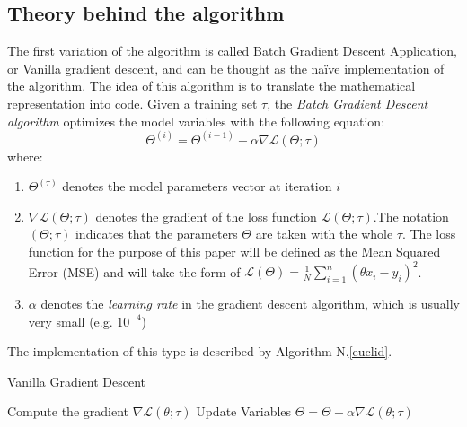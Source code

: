 \documentclass[conference]{IEEEtran}
\begin{document}
\subsection{Theory behind the algorithm}
The first variation of the algorithm is called Batch Gradient Descent Application, or Vanilla gradient descent, and can be thought as the naïve implementation of the algorithm.\cite{JZ2019} 
The idea of this algorithm is to translate the mathematical representation into code. 
Given a training set $\tau$, the \textit{Batch Gradient Descent algorithm} optimizes the model variables with the following equation:
\begin{equation}
    \Theta^{(i)} = \Theta^{(i-1)} -\alpha\nabla\mathscr{L}(\Theta;\tau)\label{BGDA}
\end{equation}
where:
\begin{enumerate}
  \item $\Theta^{(\tau)}$ denotes the model parameters vector at iteration $i$
  \item $\nabla\mathscr{L}(\Theta;\tau)$ denotes the gradient of the loss function $\mathscr{L}(\Theta;\tau)$.The notation $(\Theta;\tau)$ indicates that the parameters $\Theta$ are taken with the whole $\tau$. The loss function for the purpose of this paper will be defined as the Mean Squared Error (MSE) and will take the form of $\mathscr{L}(\Theta)= \frac{1}{N}\sum_{i=1}^{n}(\theta x_i - y_i)^2$.
  \item $\alpha$ denotes the  \textit{learning rate} in the gradient descent algorithm, which is usually very small (e.g. $10^{-4}$)
\end{enumerate}

The implementation of this type is described by Algorithm N.\ref{euclid}.

\begin{algorithm}
\caption{Vanilla Gradient Descent}\label{euclid}
\begin{algorithmic}[1]
\State Compute the gradient $\nabla\mathscr{L}(\theta;\tau)$
\State Update Variables $\Theta = \Theta -\alpha\nabla\mathscr{L}(\theta;\tau)$
\EndFor
\State {} 
\end{algorithmic}
\end{algorithm}
\end{document}
